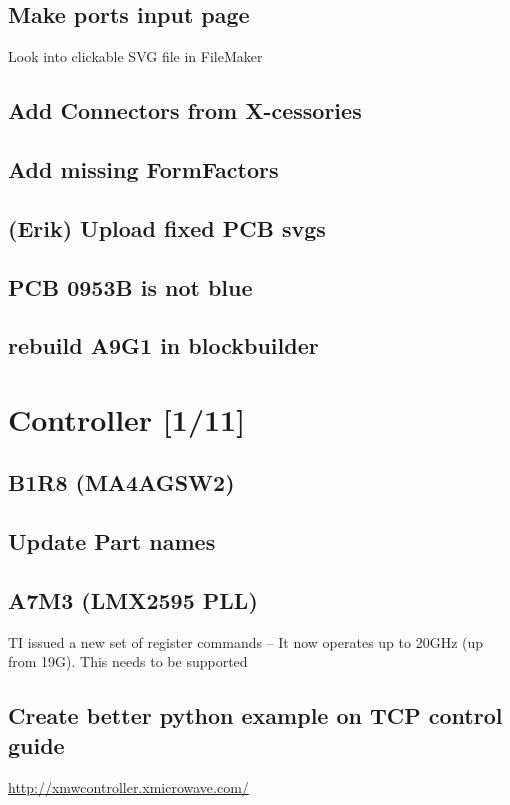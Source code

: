 \documentclass[11pt]{article}
\begin{document}
\subsection{Make ports input page}
\label{sec:org4ed5e74}
Look into clickable SVG file in FileMaker
\subsection{Add Connectors from X-cessories}
\label{sec:org3cd306c}
\subsection{Add missing FormFactors}
\label{sec:org450f02b}
\subsection{(Erik) Upload fixed PCB svgs}
\label{sec:orga154b2f}

\subsection{PCB 0953B is not blue}
\label{sec:orgc6a8f60}

\subsection{rebuild A9G1 in blockbuilder}
\label{sec:org1857771}

\section{Controller [1/11]}
\label{sec:org3318db2}
\subsection{B1R8 (MA4AGSW2)}
\label{sec:org5c9e6dc}
\subsection{Update Part names}
\label{sec:org962a42a}
\subsection{A7M3 (LMX2595 PLL)}
\label{sec:orgb2ae549}
TI issued a new set of register commands -- It now operates up to 20GHz (up from 19G). This needs to be supported

\subsection{Create better python example on TCP control guide}
\label{sec:orgd4e9b93}
\url{http://xmwcontroller.xmicrowave.com/}
\end{document}
